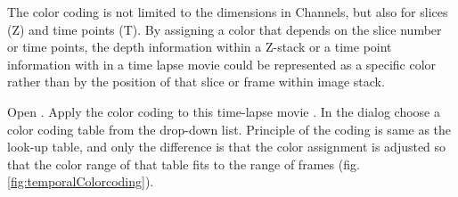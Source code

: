 The color coding is not limited to the dimensions in Channels, but also for slices (Z) and time points (T). By assigning a color that depends on the slice number or time points, the depth information within a Z-stack or a time point information with in a time lapse movie could be represented as a specific color rather than by the position of that slice or frame within image stack.


\begin{indentexercise}{1}
Open . Apply the color coding to this time-lapse movie . In the dialog choose a color coding table from the drop-down list. Principle of the coding is same as the look-up table, and only the difference is that the color assignment is adjusted so that the color range of that table fits to the range of frames (fig. \ref{fig:temporalColorcoding}). 



\end{indentexercise}
